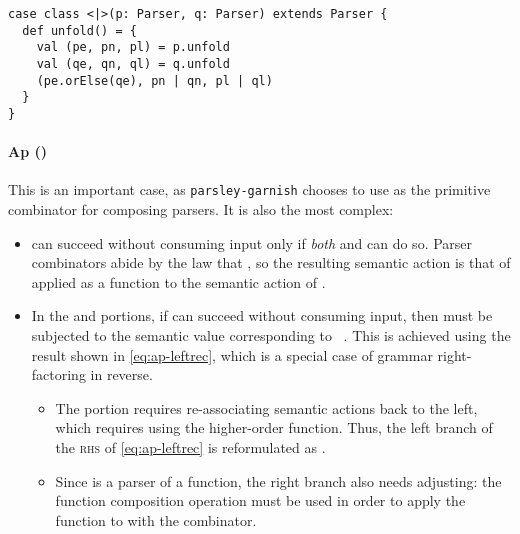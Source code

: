 \documentclass[../../main.tex]{subfiles}
\begin{document}
\begin{verbatim}
case class <|>(p: Parser, q: Parser) extends Parser {
  def unfold() = {
    val (pe, pn, pl) = p.unfold
    val (qe, qn, ql) = q.unfold
    (pe.orElse(qe), pn | qn, pl | ql)
  }
}
\end{verbatim}

\paragraph{Ap (\scala{<*>})}
This is an important case, as \texttt{parsley-garnish} chooses to use \scala{<*>} as the primitive combinator for composing parsers.
It is also the most complex:
\begin{itemize}
  \item {} can succeed without consuming input only if \emph{both}  and  can do so. Parser combinators abide by the law that , so the resulting semantic action is that of  applied as a function to the semantic action of .
  \item In the  and  portions, if  can succeed without consuming input, then  must be subjected to the semantic value corresponding to ~\cite{swierstra_deterministic_1996}. This is achieved using the result shown in \cref{eq:ap-leftrec}, which is a special case of grammar right-factoring in reverse.
  \begin{itemize}
    \item The  portion requires re-associating semantic actions back to the left, which requires using the  higher-order function. Thus, the left branch of the \textsc{rhs} of \cref{eq:ap-leftrec} is reformulated as .
    \item Since  is a parser of a function, the right branch also needs adjusting: the function composition operation must be used in order to apply the function to  with the \scala{<*>} combinator.
  \end{itemize}
\end{itemize}
\end{document}
